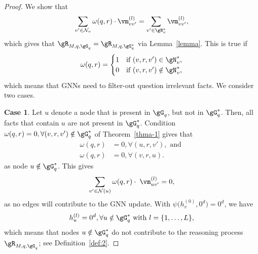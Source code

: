 \begin{proof}
 We show that 
\begin{equation}
    \sum_{v' \in \mathcal{N}_v } \omega(q, r) \cdot \vm_{vv'}^{(l)}  = \sum_{v' \in \gN^\ast_v }  \vm_{vv'}^{(l)},
\end{equation}
which gives that $\gR_{M, q, \gG_q} = \gR_{M, q, \gG_q^\ast}$ via Lemma~\ref{lemma}.
This is true if 
\begin{equation}
    \omega(q, r) =
    \begin{cases}
      1 & \text{if $(v, r, v') \in \gN^\ast_v$,}\\
      0 & \text{if $(v, r, v') \notin \gN^\ast_v$,}
    \end{cases}       
\end{equation}
which means that GNNs need to filter-out question irrelevant facts. 
We consider two cases.


\textbf{Case 1}. Let $u$ denote a node that is present in $\gG_q$, but not in $\gG^\ast_q$. Then, all facts that contain $u$ are not present in $\gG^\ast_q$. Condition $\omega(q, r)=0 , \forall (v,r,v') \notin \gG_q^\ast$ of Theorem~\ref{thma-1} gives that 
\begin{align}
    \omega(q,r) &= 0, \forall (u,r,v'), \text{ and } \nonumber \\
    \omega(q,r) &= 0, \forall (v,r,u).
\end{align}
as node $u \notin \gG_q^\ast$. 
This gives
\begin{equation}
    \sum_{v' \in \mathcal{N}(u) } \omega(q, r) \cdot \; \vm_{uv'}^{(l)} = 0,
\end{equation}
as no edges will contribute to the GNN update. With $\psi \Big(h_v^{(0)}, 0^d \Big) = 0^d$, we have 
\begin{equation}
    h_u^{(l)} = 0^d, \forall u \notin \gG^\ast_q \text{ with } l=\{1, \dots, L\},
\end{equation}
which means that nodes $u \notin \gG^\ast_q $ do not contribute to the reasoning process $\gR_{M, q, \gG_q}$; see Definition~\ref{def:2}.


\end{proof}
